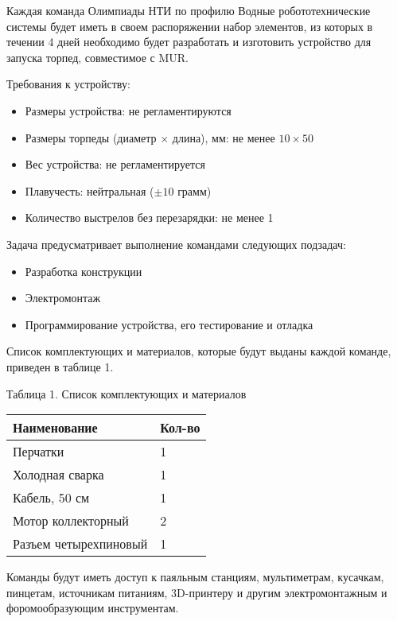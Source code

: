 
Каждая команда Олимпиады НТИ по профилю Водные робототехнические системы будет иметь в своем распоряжении набор элементов, из которых в течении 4 дней необходимо будет разработать и изготовить устройство для запуска торпед, совместимое с MUR. 

Требования к устройству:
\begin{itemize}
    \item Размеры устройства: не регламентируются
    \item Размеры торпеды (диаметр $\times$ длина), мм: не менее $10 \times 50$
    \item Вес устройства: не регламентируется
    \item Плавучесть: нейтральная ($\pm 10$ грамм)
    \item Количество выстрелов без перезарядки: не менее 1
\end{itemize}

Задача предусматривает выполнение командами следующих подзадач:
\begin{itemize}
    \item Разработка конструкции
    \item Электромонтаж 
    \item Программирование устройства, его тестирование и отладка
\end{itemize}

Список комплектующих и материалов, которые будут выданы каждой команде, приведен в таблице 1.

\begin{table}[H]
    \center
    Таблица 1. Список комплектующих и материалов
    \begin{tabular}{|l|l|}
        \hline
        \textbf{Наименование} & \textbf{Кол-во} \\
        \hline
        Перчатки & 1 \\
        \hline
        Холодная сварка & 1 \\
        \hline
        Кабель, 50 см & 1 \\
        \hline
        Мотор коллекторный & 2 \\
        \hline
        Разъем четырехпиновый & 1 \\
        \hline
    \end{tabular}
\end{table}

Команды будут иметь доступ к паяльным станциям, мультиметрам, кусачкам, пинцетам, источникам питаниям, 3D-принтеру и другим электромонтажным и форомообразующим инструментам. 

